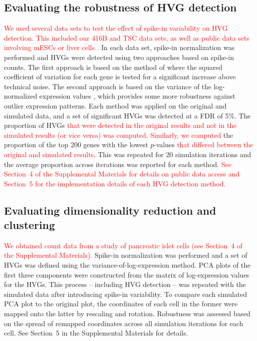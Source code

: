 \documentclass{article}
\newcommand{\suppsecdata}{4}
\newcommand{\suppsecsim}{5}
\newcommand{\revised}[1]{\textcolor{red}{#1}}
\begin{document}
\subsection*{Evaluating the robustness of HVG detection}
\revised{We used several data sets to test the effect of spike-in variability on HVG detection.
This included our 416B and TSC data sets, as well as public data sets involving mESCs \autocite{kolod2015single} or liver cells \autocite{scialdone2015computational}.}
In each data set, spike-in normalization was performed and HVGs were detected using two approaches based on spike-in counts.
The first approach is based on the method of \cite{brennecke2013accounting} where the squared coefficient of variation for each gene is tested for a significant increase above technical noise.
The second approach is based on the variance of the log-normalized expression values \autocite{lun2016stepbystep}, which provides some more robustness against outlier expression patterns.
Each method was applied on the original and simulated data, and a set of significant HVGs was detected at a FDR of 5\%.
The proportion of HVGs \revised{that were detected in the original results and not in the simulated results (or vice versa) was computed.}
\revised{Similarly, we computed} the proportion of the top 200 genes with the lowest $p$-values \revised{that differed between the original and simulated results.}
This was repeated for 20 simulation iterations and the average proportion across iterations was reported for each method.
\revised{See Section~\suppsecdata{} of the Supplemental Materials for details on public data access and Section~\suppsecsim{} for the implementation details of each HVG detection method.}

\subsection*{Evaluating dimensionality reduction and clustering}
\revised{We obtained count data from a study of pancreatic islet cells \autocite{segerstople2016single} (see Section~\suppsecdata{} of the Supplemental Materials).}
Spike-in normalization was performed and a set of HVGs was defined using the variance-of-log-expression method.
PCA plots of the first three components were constructed from the matrix of log-expression values for the HVGs.
This process -- including HVG detection -- was repeated with the simulated data after introducing spike-in variability.
To compare each simulated PCA plot to the original plot, the coordinates of each cell in the former were mapped onto the latter by rescaling and rotation.
Robustness was assessed based on the spread of remapped coordinates across all simulation iterations for each cell.
See Section~\suppsecsim{} in the Supplemental Materials for details.
\end{document}
